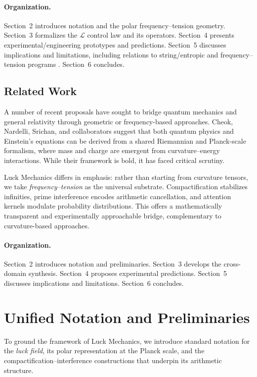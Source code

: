 \documentclass[12pt]{article}
\newcommand{\Luck}{\mathcal{L}}
\theoremstyle{plain}
\theoremstyle{definition}
\begin{document}
\paragraph{Organization.}
Section~2 introduces notation and the polar frequency–tension geometry. Section~3 formalizes the $\Luck$ control law and its operators. Section~4 presents experimental/engineering prototypes and predictions. Section~5 discusses implications and limitations, including relations to string/entropic and frequency–tension programs \citep{STheory,Backreaction,EntropicGravity}. Section~6 concludes.
\subsection{Related Work}
A number of recent proposals have sought to bridge quantum mechanics and general relativity through geometric or frequency-based approaches.  
Cheok, Nardelli, Srichan, and collaborators \citep{Cheok2025} suggest that both quantum physics and Einstein’s equations can be derived from a shared Riemannian and Planck-scale formalism, where mass and charge are emergent from curvature–energy interactions. While their framework is bold, it has faced critical scrutiny.  

Luck Mechanics differs in emphasis: rather than starting from curvature tensors, we take \emph{frequency–tension} as the universal substrate. Compactification stabilizes infinities, prime interference encodes arithmetic cancellation, and attention kernels modulate probability distributions. This offers a mathematically transparent and experimentally approachable bridge, complementary to curvature-based approaches.

\paragraph{Organization.}  
Section~2 introduces notation and preliminaries. Section~3 develops the cross-domain synthesis. Section~4 proposes experimental predictions. Section~5 discusses implications and limitations. Section~6 concludes.


\section{Unified Notation and Preliminaries}

To ground the framework of Luck Mechanics, we introduce standard notation for the 
\emph{luck field}, its polar representation at the Planck scale, and the 
compactification–interference constructions that underpin its arithmetic structure.  
\end{document}
